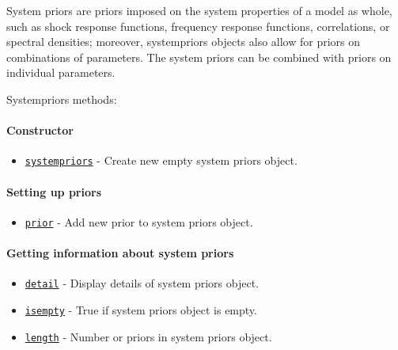 

	System priors are priors imposed on the system properties of a model as
whole, such as shock response functions, frequency response functions,
correlations, or spectral densities; moreover, systempriors objects also
allow for priors on combinations of parameters. The system priors can be
combined with priors on individual parameters.

Systempriors methods:

\paragraph{Constructor}

\begin{itemize}
\itemsep1pt\parskip0pt
\item
  \href{systempriors/systempriors}{\texttt{systempriors}} - Create new
  empty system priors object.
\end{itemize}

\paragraph{Setting up priors}

\begin{itemize}
\itemsep1pt\parskip0pt
\item
  \href{systempriors/prior}{\texttt{prior}} - Add new prior to system
  priors object.
\end{itemize}

\paragraph{Getting information about system
priors}

\begin{itemize}
\itemsep1pt\parskip0pt
\item
  \href{systempriors/detail}{\texttt{detail}} - Display details of
  system priors object.
\item
  \href{systempriors/isempty}{\texttt{isempty}} - True if system priors
  object is empty.
\item
  \href{systempriors/length}{\texttt{length}} - Number or priors in
  system priors object.
\end{itemize}




